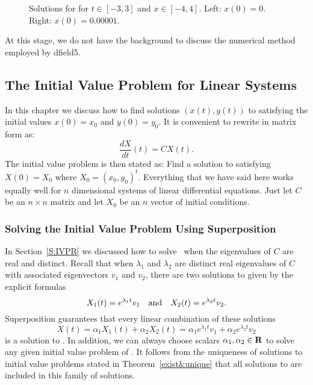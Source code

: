 \begin{figure}[htb]
        \centerline{%
	}
        \caption{Solutions for \protect{}
              for $t\in [-3,3]$ and $x\in [-4,4]$. Left: $x(0)=0$.
	      Right: $x(0)=0.00001$.}
        \label{nonuniquefig}
\end{figure}

At this stage, we do not have the background to discuss the numerical
method employed by {\sf dfield5}.

\subsection*{The Initial Value Problem for Linear Systems}

In this chapter we discuss how to find solutions $(x(t),y(t))$ to
 satisfying the initial values $x(0)=x_0$ and $y(0)=y_0$.
It is convenient to rewrite  in matrix form as:
\begin{equation} \label{ndlinsystem}
\frac{dX}{dt}(t) = CX(t).
\end{equation}
The initial value problem is then stated as:  Find a solution to
 satisfying $X(0)=X_0$ where $X_0=(x_0,y_0)^t$.
Everything that we have said here works equally well for $n$
dimensional systems of linear differential equations.  Just let
$C$ be an $n\times n$ matrix and let $X_0$ be an $n$ vector
of initial conditions.

\subsubsection*{Solving the Initial Value Problem Using Superposition}

In Section~\ref{S:IVPR} we discussed how to solve~ when the
eigenvalues of $C$ are real and distinct.  Recall that when $\lambda_1$ and
$\lambda_2$ are distinct real eigenvalues of $C$ with associated
eigenvectors $v_1$ and $v_2$, there are two solutions to 
given by the explicit formulas
\[
X_1(t) = e^{\lambda_1 t}v_1 \quad\mbox{and}\quad X_2(t) = e^{\lambda_2 t}v_2.
\]
Superposition guarantees that every linear combination of these solutions
\[
X(t) = \alpha_1X_1(t)+\alpha_2X_2(t) =
\alpha_1e^{\lambda_1 t}v_1 + \alpha_2e^{\lambda_2 t}v_2
\]
is a solution to .  In addition, we can always choose
scalars $\alpha_1,\alpha_2\in\mbox{$\bf{R}$}$ to solve any given initial value problem
of .   It follows from the uniqueness of solutions to
initial value problems stated in Theorem~\ref{exist&unique} that all
solutions to  are included in this family of solutions.

